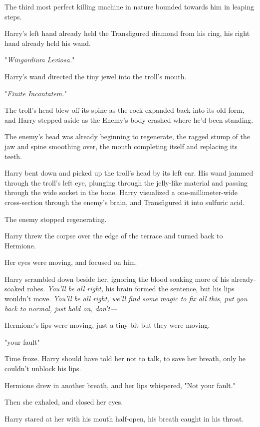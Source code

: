 The third most perfect killing machine in nature bounded towards him in leaping
steps.

\emph{}

Harry's left hand already held the Transfigured diamond from his ring, his
right hand already held his wand.

"\emph{Wingardium Leviosa.}"

Harry's wand directed the tiny jewel into the troll's mouth.

"\emph{Finite Incantatem.}"

The troll's head blew off its spine as the rock expanded back into its old
form, and Harry stepped aside as the Enemy's body crashed where he'd been
standing.

The enemy's head was already beginning to regenerate, the ragged stump of the
jaw and spine smoothing over, the mouth completing itself and replacing its
teeth.

Harry bent down and picked up the troll's head by its left ear. His wand jammed
through the troll's left eye, plunging through the jelly-like material and
passing through the wide socket in the bone. Harry visualized a
one-millimeter-wide cross-section through the enemy's brain, and Transfigured
it into sulfuric acid.

The enemy stopped regenerating.

Harry threw the corpse over the edge of the terrace and turned back to Hermione.

Her eyes were moving, and focused on him.

Harry scrambled down beside her, ignoring the blood soaking more of his
already-soaked robes. \emph{You'll be all right,} his brain formed the
sentence, but his lips wouldn't move. \emph{You'll be all right, we'll find
some magic to fix all this, put you back to normal, just hold on, don't---}

Hermione's lips were moving, just a tiny bit but they were moving.

"your{\el} fault{\el}"

Time froze. Harry should have told her not to talk, to save her breath, only he
couldn't unblock his lips.

Hermione drew in another breath, and her lips whispered, "Not your fault."

Then she exhaled, and closed her eyes.

Harry stared at her with his mouth half-open, his breath caught in his throat.

